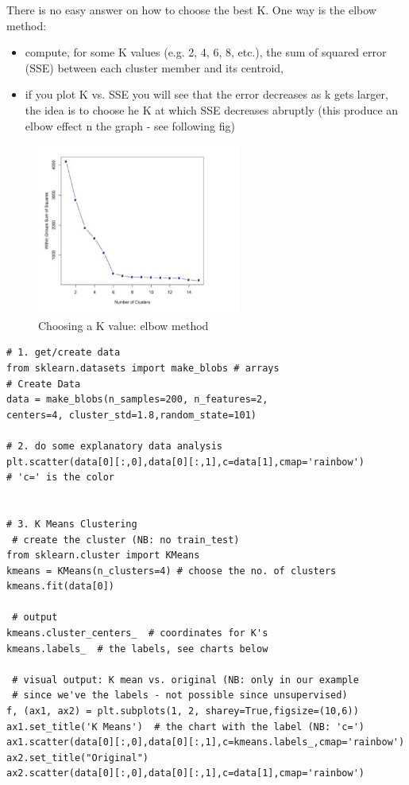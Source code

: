 \documentclass[12pt]{article}
\begin{document}
There is no easy answer on how to choose the best K. One way is the  elbow method:
\begin{itemize}
	\item compute, for some K values (e.g. 2, 4, 6, 8, etc.), the sum of squared error (SSE) between each cluster member and its centroid,
	\item if you plot K vs. SSE you will see that the error decreases as k gets larger, the idea is to choose he K at which SSE decreases abruptly (this produce an elbow effect n the graph - see following fig) 
\end{itemize} 
\begin{figure}[htbp] 
	\centering
	\includegraphics[width=0.6\textwidth]{pics/elbow}
	\caption{Choosing a K value: elbow method} 
\end{figure}

\begin{lstlisting}
# 1. get/create data
from sklearn.datasets import make_blobs # arrays
# Create Data
data = make_blobs(n_samples=200, n_features=2, 
centers=4, cluster_std=1.8,random_state=101)

# 2. do some explanatory data analysis
plt.scatter(data[0][:,0],data[0][:,1],c=data[1],cmap='rainbow')
# 'c=' is the color


# 3. K Means Clustering
 # create the cluster (NB: no train_test) 
from sklearn.cluster import KMeans
kmeans = KMeans(n_clusters=4) # choose the no. of clusters
kmeans.fit(data[0])

 # output
kmeans.cluster_centers_  # coordinates for K's
kmeans.labels_  # the labels, see charts below

 # visual output: K mean vs. original (NB: only in our example 
 # since we've the labels - not possible since unsupervised)
f, (ax1, ax2) = plt.subplots(1, 2, sharey=True,figsize=(10,6))
ax1.set_title('K Means')  # the chart with the label (NB: 'c=')
ax1.scatter(data[0][:,0],data[0][:,1],c=kmeans.labels_,cmap='rainbow')
ax2.set_title("Original")
ax2.scatter(data[0][:,0],data[0][:,1],c=data[1],cmap='rainbow')
\end{lstlisting}
\end{document}
